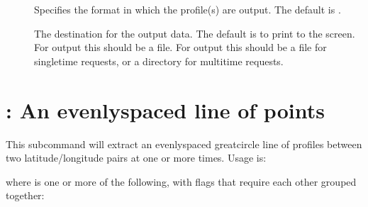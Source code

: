\documentclass[letterpaper,10pt,english]{sphinxmanual}
\begin{document}
\sphinxAtStartPar
{}
\begin{description}
\item[{}] \leavevmode
\sphinxAtStartPar
Specifies the format in which the profile(s) are output.  The default is .

\item[{}] \leavevmode
\sphinxAtStartPar
The destination for the output data.  The default is to print to the screen.  For  output this should be a file.  For  output this should be a file for single\sphinxhyphen{}time requests, or a directory for multi\sphinxhyphen{}time requests.

\item[{}] \leavevmode
\sphinxAtStartPar
{}

\sphinxAtStartPar
{}

\end{description}


\section{: An evenly\sphinxhyphen{}spaced line of points}
\label{\detokenize{userguide:line-an-evenly-spaced-line-of-points}}
\sphinxAtStartPar
This subcommand will extract an evenly\sphinxhyphen{}spaced great\sphinxhyphen{}circle line of profiles between two latitude/longitude pairs at one or more times.  Usage is:

\sphinxAtStartPar
{}

\sphinxAtStartPar
where \sphinxcode{\sphinxupquote{{[}flags{]}}} is one or more of the following, with flags that require each other grouped together:
\end{document}
